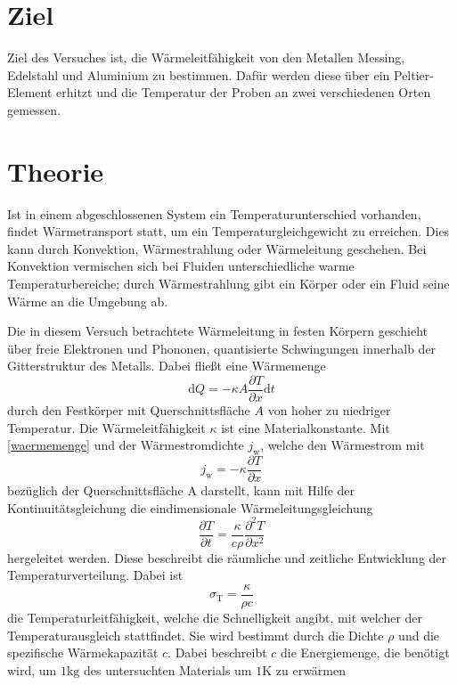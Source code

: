 \section{Ziel}
\label{sec:ziel}

Ziel des Versuches ist, die Wärmeleitfähigkeit von den Metallen Messing, Edelstahl und Aluminium zu bestimmen. Dafür werden diese über ein Peltier-Element erhitzt und die Temperatur der Proben an zwei verschiedenen Orten gemessen.

\section{Theorie}
\label{sec:theorie}

Ist in einem abgeschlossenen System ein Temperaturunterschied vorhanden, findet Wärmetransport statt, um ein Temperaturgleichgewicht zu erreichen. Dies kann durch Konvektion, Wärmestrahlung oder Wärmeleitung geschehen. 
Bei Konvektion vermischen sich bei Fluiden unterschiedliche warme Temperaturbereiche; 
durch Wärmestrahlung gibt ein Körper oder ein Fluid seine Wärme an die Umgebung ab.

Die in diesem Versuch betrachtete Wärmeleitung in festen Körpern geschieht über freie Elektronen und Phononen, quantisierte Schwingungen innerhalb der Gitterstruktur des Metalls.
Dabei fließt eine Wärmemenge
\begin{equation}
	\label{waermemenge}
	\mathup{d}Q=-\kappa A\frac{\partial{T}}{\partial{x}}\mathup{d}t
\end{equation}
durch den Festkörper mit Querschnittsfläche $A$ von hoher zu niedriger Temperatur.
Die Wärmeleitfähigkeit $\kappa$ ist eine Materialkonstante.
Mit \eqref{waermemenge} und der Wärmestromdichte $j_\mathup{w}$, welche den Wärmestrom mit 
\begin{equation}
	\label{waermestromdichte}
	j_\mathup{w}= -\kappa \frac{\partial{T}}{\partial{x}}
\end{equation}
bezüglich der Querschnittsfläche A darstellt,
kann mit Hilfe der Kontinuitätsgleichung die eindimensionale Wärmeleitungsgleichung
\begin{equation}
	\label{waermeleitungsgleichung}
	\frac{\partial{T}}{\partial{t}} =  \frac{\kappa}{c\rho}\frac{\partial^2{T}}{\partial{x^2}}
\end{equation}
hergeleitet werden.
Diese beschreibt die räumliche und zeitliche Entwicklung der Temperaturverteilung. 
Dabei ist
\begin{equation}
	\label{temperaturleitfaehigkeit}
	\sigma_\mathup{T}=\frac{\kappa}{{\rho}c}
\end{equation}
die Temperaturleitfähigkeit, welche die Schnelligkeit angibt, mit welcher der Temperaturausgleich stattfindet.
Sie wird bestimmt durch die Dichte $\rho$ und die spezifische Wärmekapazität $c$. 
Dabei beschreibt $c$ die Energiemenge, die benötigt wird, um $1\si{\kilo\gram}$ des untersuchten Materials um $1\si{\kelvin}$ zu erwärmen

